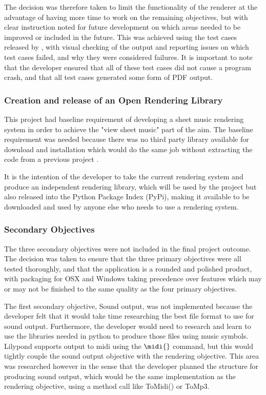 The decision was therefore taken to limit the functionality of the renderer at the advantage of having more time to work on the remaining objectives, but with clear instruction noted for future development on which areas needed to be improved or included in the future. This was achieved using the test cases released by \cite{Lilypond}, with visual checking of the output and reporting issues on which test cases failed, and why they were considered failures. It is important to note that the developer ensured that all of these test cases did not cause a program crash, and that all test cases generated some form of PDF output.

\subsubsection{Creation and release of an Open Rendering Library}
This project had baseline requirement of developing a sheet music rendering system in order to achieve the "view sheet music" part of the aim.  The baseline requirement was needed because there was no third party library available for download and installation which would do the same job without extracting the code from a previous project \parencite{pypi}.

It is the intention of the developer to take the current rendering system and produce an independent rendering library, which will be used by the project but also released into the Python Package Index (PyPi), making it available to be downloaded and used by anyone else who needs to use a rendering system.

\subsubsection{Secondary Objectives}
The three secondary objectives were not included in the final project outcome.  The decision was taken to ensure that the three primary objectives were all tested thoroughly, and that the application is a rounded and polished product, with packaging for OSX and Windows taking precedence over features which may or may not be finished to the same quality as the four primary objectives. 

The first secondary objective, Sound output, was not implemented because the developer felt that it would take time researching the best file format to use for sound output. Furthermore, the developer would need to research and learn to use the libraries needed in python to produce those files using music symbols. Lilypond supports output to midi using the $\midi{}$ command, but this would tightly couple the sound output objective with the rendering objective. This area was researched however in the sense that the developer planned the structure for producing sound output, which would be the same implementation as the rendering objective, using a method call like ToMidi() or ToMp3.

